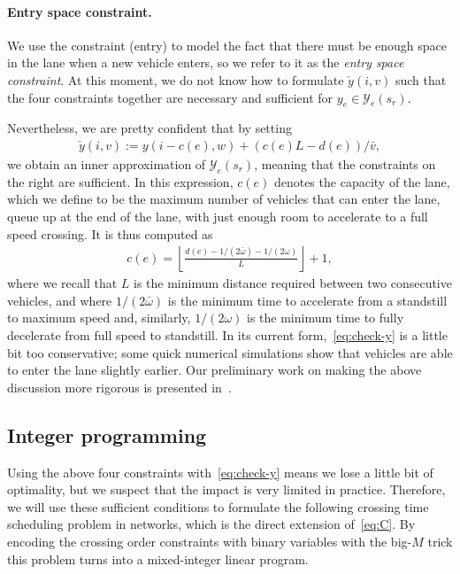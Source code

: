 \documentclass{report}
\theoremstyle{definition}
\theoremstyle{plain}
\begin{document}
\paragraph{Entry space constraint.}

We use the constraint (entry) to model the fact that there must be enough space
in the lane when a new vehicle enters, so we refer to it as the \emph{entry space
  constraint}.
%
At this moment, we do not know how to formulate $\check{y}(i, v)$ such that the
four constraints together are necessary and sufficient for
$y_e \in \mathcal{Y}_e(s_r)$.

Nevertheless, we are pretty confident that by setting
\begin{align}\label{eq:check-y}
  \check{y}(i, v) := y(i - c(e), w) + (c(e) L - d(e)) / \bar{v} ,
\end{align}
%
we obtain an inner approximation of $\mathcal{Y}_e(s_r)$, meaning that the
constraints on the right are sufficient.
%
In this expression, $c(e)$ denotes the capacity of the lane, which we define to
be the maximum number of vehicles that can enter the lane, queue up at the end
of the lane, with just enough room to accelerate to a full speed crossing. It is
thus computed as
\begin{align}
  c(e) = \left\lfloor \frac{d(e) - 1/(2\bar{\omega}) - 1/(2\omega)}{L} \right\rfloor + 1 ,
\end{align}
where we recall that $L$ is the minimum distance required between two
consecutive vehicles, and where $1/(2\bar{\omega})$ is the minimum time to
accelerate from a standstill to maximum speed and, similarly, $1/(2\omega)$ is the minimum
time to fully decelerate from full speed to standstill.
%
In its current form,~\eqref{eq:check-y} is a little bit too conservative; some
quick numerical simulations show that vehicles are able to enter the lane
slightly earlier.
%
Our preliminary work on making the above discussion more rigorous is presented
in~.

\subsection{Integer programming}

Using the above four constraints with~\eqref{eq:check-y} means we lose a little
bit of optimality, but we suspect that the impact is very limited in practice.
%
Therefore, we will use these sufficient conditions to formulate the following
crossing time scheduling problem in networks, which is the direct extension
of~\eqref{eq:C}.
%
By encoding the crossing order constraints with binary variables with the
big-$M$ trick this problem turns into a mixed-integer linear program.
\end{document}
